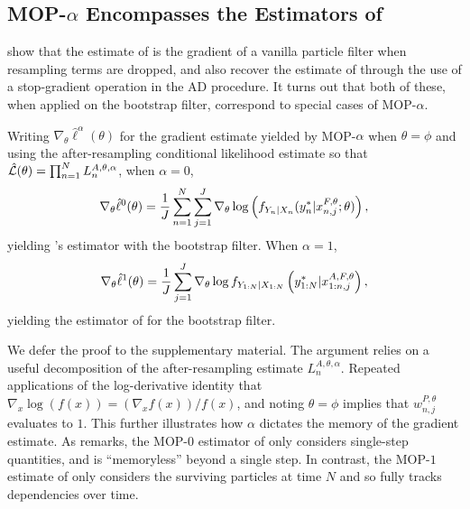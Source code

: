 \documentclass[9pt,twocolumn,pnasresearcharticle]{pnas-new}
\newcommand\arxiv[2]{#2} %
\begin{document}
\arxiv{}{\vspace*{-2mm}}
\subsection{MOP-$\alpha$ Encompasses the Estimators of \cite{poyiadjis11, scibior21, naesseth18}}

\cite{scibior21} show that the estimate of \cite{naesseth18} is the gradient of a vanilla particle filter when resampling terms are dropped, and also recover the estimate of \cite{poyiadjis11} through the use of a stop-gradient operation in the AD procedure. It turns out that both of these, when applied on the bootstrap filter, correspond to special cases of MOP-$\alpha$.


\begin{thm}
    \label{thm:mop-functional-forms}
    Writing $\nabla_\theta \hat\ell^\alpha(\theta)$ for the gradient estimate yielded by MOP-$\alpha$ when $\theta=\phi$ and using the after-resampling conditional likelihood estimate so that $\hat{\mathcal{L}}(\theta) = \prod_{n=1}^N L_n^{A, \theta, \alpha}$, when $\alpha=0$,
    \vspace*{-2.5mm}
    \begin{equation} \nonumber
        \nabla_\theta \hat\ell^0(\theta) 
        = \frac{1}{J} \sum_{n=1}^N \sum_{j=1}^J \nabla_\theta \log\left(f_{Y_n|X_{n}}(y_n^*|x_{n,j}^{F, \theta}; \theta)\right),
        \vspace*{-2.5mm}
    \end{equation}
    yielding \cite{naesseth18}'s estimator with the bootstrap filter. When $\alpha=1$,
    \vspace*{-2.5mm}
    \begin{equation} \nonumber
        \nabla_\theta \hat{\ell}^1(\theta) 
        = \frac{1}{J}\sum_{j=1}^J \nabla_\theta \log f_{Y_{1:N}|X_{1:N}}\left(y_{1:N}^* | x_{1:n,j}^{A, F,\theta}\right),
    \vspace*{-2.5mm}
    \end{equation}
    yielding the estimator of \cite{poyiadjis11, scibior21} for the bootstrap filter.
\end{thm}

We defer the proof to \arxiv{Appendix~\ref{appendix:functional}}{the supplementary material}. 
The argument relies on a useful decomposition of the after-resampling estimate $L_n^{A,\theta,\alpha}$. 
Repeated applications of the log-derivative identity that $\nabla_x \log(f(x)) = (\nabla_x f(x))/f(x)$, and noting $\theta=\phi$ implies that $w_{n,j}^{P,\theta}$ evaluates to $1$. 
This further illustrates how $\alpha$ dictates the memory of the gradient estimate. 
As \cite{scibior21} remarks, the MOP-$0$ estimator of \cite{naesseth18} only considers single-step quantities, and is ``memoryless'' beyond a single step. 
In contrast, the MOP-$1$ estimate of \cite{poyiadjis11, scibior21} only considers the surviving particles at time $N$ and so fully tracks dependencies over time. 
\end{document}
